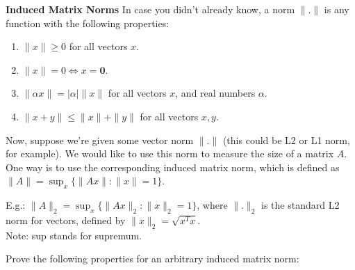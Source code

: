 \documentclass[solution,addpoints,12pt]{exam}
\newenvironment{Solution}{\begin{EnvFullwidth}\begin{solution}}{\end{solution}\end{EnvFullwidth}}
\begin{document}
\begin{questions}
\begin{Solution}
\end{Solution}

\question * \textbf{Induced Matrix Norms}
\newline
In case you didn't already know, a norm $\|.\|$ is any function with the following properties:
\begin{enumerate}
    \item $\|x\| \geq 0$ for all vectors $x$.
    \item $\|x\| = 0 \iff x = \mathbf{0}$.
    \item $\|\alpha x\| = |\alpha| \|x\|$ for all vectors $x$, and real numbers $\alpha$.
    \item $\|x + y\| \leq \|x\| + \|y\|$ for all vectors $x, y$.
\end{enumerate}

Now, suppose we're given some vector norm $\|.\|$ (this could be L2 or L1 norm, for example). We would like to use this norm to measure the size of a matrix $A$. One way is to use the corresponding induced matrix norm, which is defined as $\|A\| = \sup_{x} \{\| Ax \| : \|x \| = 1\}$.

E.g.: $\|A\|_2 = \sup_{x} \{ \|Ax\|_2 : \|x\|_2 = 1 \}$, where $\|.\|_2$ is the standard L2 norm for vectors, defined by $\|x\|_2 = \sqrt{x^Tx}$.\\
Note: sup stands for supremum.

Prove the following properties for an arbitrary induced matrix norm:

\end{questions}
\end{document}
